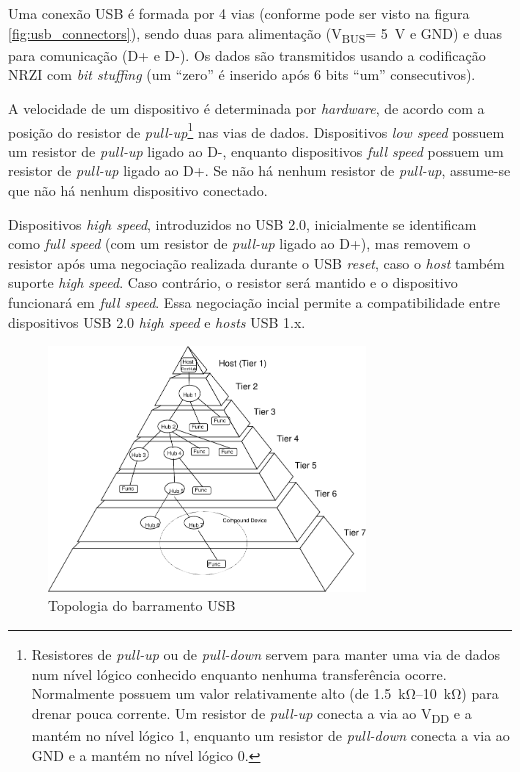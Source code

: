 \documentclass[brazil,pagestart=firstchapter]{abnt}
\newcommand*{\VBUS}{V\textsubscript{BUS}\xspace}
\newcommand*{\VDD}{V\textsubscript{DD}\xspace}
\newcommand*{\GND}{GND\xspace}
\begin{document}
Uma conexão \ac{USB} é formada por 4 vias (conforme pode ser visto na figura
\ref{fig:usb_connectors}), sendo duas para alimentação (\VBUS =
\SI{+5}{\volt} e \GND) e duas para comunicação (D+ e D-). Os dados são
transmitidos usando a codificação \ac{NRZI} com \textit{bit stuffing} (um
``zero'' é inserido após 6 bits ``um'' consecutivos). \cite[p.~157]{usb20}
\cite[cap.~2]{usbinanutshell}

A velocidade de um dispositivo é determinada por \textit{hardware}, de
acordo com a posição do resistor de \textit{pull-up}\footnote{
	Resistores de \textit{pull-up} ou de \textit{pull-down} servem para
	manter uma via de dados num nível lógico conhecido enquanto nenhuma
	transferência ocorre.  Normalmente possuem um valor relativamente alto
	(de \SIrange{1.5}{10}{\kilo\ohm}) para drenar pouca corrente. Um
	resistor de \textit{pull-up} conecta a via ao \VDD e a mantém no nível
	lógico 1, enquanto um resistor de \textit{pull-down} conecta a via ao
	\GND e a mantém no nível lógico 0.}
nas vias de dados. Dispositivos
\textit{low speed} possuem um resistor de \textit{pull-up} ligado ao D-,
enquanto dispositivos \textit{full speed} possuem  um resistor de
\textit{pull-up} ligado ao D+. Se não há nenhum resistor de
\textit{pull-up}, assume-se que não há nenhum dispositivo conectado.
\cite[p.~141]{usb20} \cite[cap.~2]{usbinanutshell}

Dispositivos \textit{high speed}, introduzidos no \ac{USB} 2.0, inicialmente
se identificam como \textit{full speed} (com um resistor de \textit{pull-up}
ligado ao D+), mas removem o resistor após uma negociação realizada durante
o USB \textit{reset}, caso o \textit{host} também suporte \textit{high
speed}. Caso contrário, o resistor será mantido e o dispositivo funcionará
em \textit{full speed}. Essa negociação incial permite a compatibilidade
entre dispositivos USB 2.0 \textit{high speed} e \textit{hosts} USB 1.x.
\cite[p.~142]{usb20} \cite[cap.~2]{usbinanutshell}

\begin{figure}[h]
\centering
\includegraphics[width=0.75\textwidth]{img/usb_bus_topology.pdf}
\caption{Topologia do barramento USB}
\label{fig:usb_topology}
\end{figure}
\end{document}
